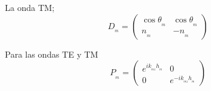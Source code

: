 \documentclass[a4paper,11pt,]{book}
\begin{document}
La onda TM;
\begin{equation}
D_{_{m}} = \left( \begin{array}{lcccl}
\cos \theta_{_{m}} & \cos \theta_{_{m}}\\

n_{_{m}} & -n_{_{m}}

\end{array}
\right)
\end{equation}

Para las ondas TE y TM 
\begin{equation}
P_{_{m}} = \left( \begin{array}{lcccl}
e^{ik_{_{mz}}h_{_{m}}} & 0\\

0 & e^{-ik_{_{mz}}h_{_{m}}}

\end{array}
\right)
\end{equation}
\end{document}
